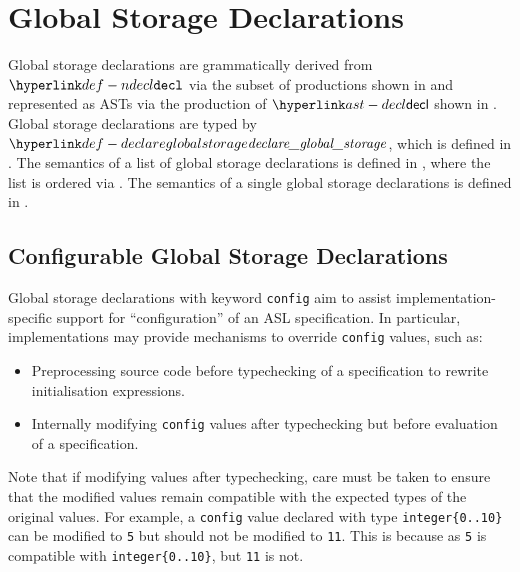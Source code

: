 \chapter{Global Storage Declarations\label{chap:GlobalStorageDeclarations}}

Global storage declarations are grammatically derived from $\Ndecl$ via the subset of productions shown in
 and represented as ASTs via the production of $\decl$
shown in .
%
Global storage declarations are typed by $\declareglobalstorage$, which is defined in .
%
The semantics of a list of global storage declarations is defined in ,
where the list is ordered via .
The semantics of a single global storage declarations is defined in .

\section{Configurable Global Storage Declarations\label{sec:ConfigurableGlobalStorageDeclarations}}
Global storage declarations with keyword \texttt{config} aim to assist implementation-specific support for ``configuration'' of an ASL specification.
In particular, implementations may provide mechanisms to override \texttt{config} values, such as:
\begin{itemize}
  \item Preprocessing source code before typechecking of a specification to rewrite initialisation expressions.
  \item Internally modifying \texttt{config} values after typechecking but before evaluation of a specification.
\end{itemize}
Note that if modifying values after typechecking, care must be taken to ensure that the modified values remain compatible with the expected types of the original values.
For example, a \texttt{config} value declared with type \verb|integer{0..10}| can be modified to \texttt{5} but should not be modified to \texttt{11}.
This is because as \texttt{5} is compatible with \verb|integer{0..10}|, but \texttt{11} is not.

